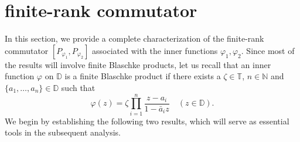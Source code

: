 \documentclass[12pt, a4 paper]{amsart}
\newcommand{\D}{\mathbb{D}}
\theoremstyle{definition}
\theoremstyle{plain}
\theoremstyle{definition}
\numberwithin{equation}{section}
\let\phi=\varphi
\begin{document}
\section{ finite-rank commutator}\label{sec2}

In this section, we provide a complete characterization of the finite-rank commutator $[P_{\phi_1}, P_{\phi_2}]$  associated with the inner functions $\phi_1, \phi_2$. Since most of the results will involve finite Blaschke products, let us recall that an inner function $\phi$ on $\D$ is a finite Blaschke product if there exists a $\zeta \in \mathbb{T}$, $n \in \mathbb{N}$ and $\{a_1, \ldots, a_n\} \in \D$ such that
\[
\phi(z) = \zeta \prod_{i=1}^n \frac{z - a_i}{1 - \bar a_i z} \quad (z \in \D).
\]
We begin by establishing the following two results, which will serve as essential tools in the subsequent analysis.
\end{document}

